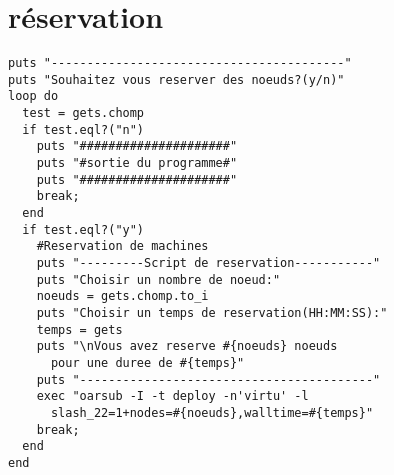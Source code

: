 \section{réservation}
\lstset{language=ruby}
\begin{lstlisting}
puts "-----------------------------------------"
puts "Souhaitez vous reserver des noeuds?(y/n)"
loop do
  test = gets.chomp
  if test.eql?("n")
    puts "#####################"
    puts "#sortie du programme#"
    puts "#####################"
    break;
  end
  if test.eql?("y")
    #Reservation de machines                                                 
    puts "---------Script de reservation-----------"
    puts "Choisir un nombre de noeud:"
    noeuds = gets.chomp.to_i
    puts "Choisir un temps de reservation(HH:MM:SS):"
    temps = gets
    puts "\nVous avez reserve #{noeuds} noeuds 
	  pour une duree de #{temps}"
    puts "-----------------------------------------"
    exec "oarsub -I -t deploy -n'virtu' -l 
	  slash_22=1+nodes=#{noeuds},walltime=#{temps}"
    break;
  end
end
\end{lstlisting}
